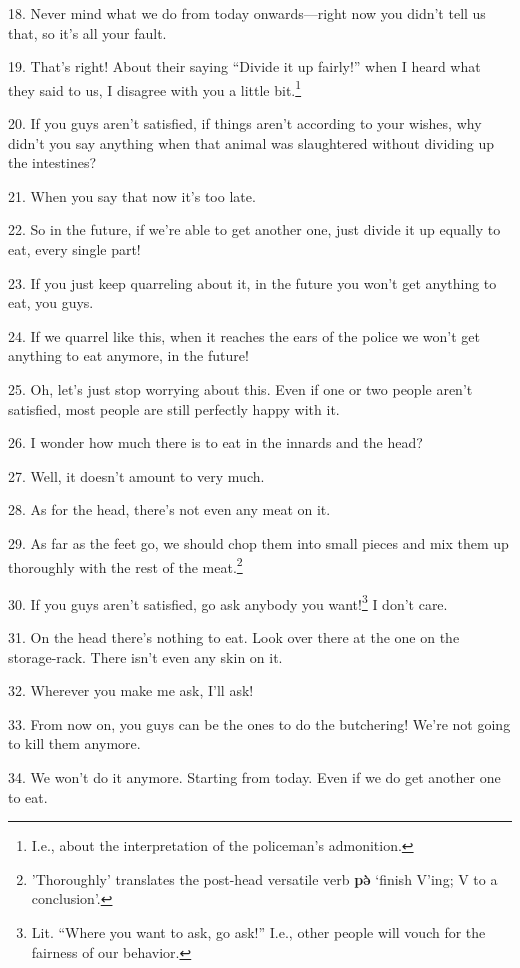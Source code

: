 18. Never mind what we do from today onwards---right now you didn't tell us that,
so it's all your fault.

19. That's right! About their saying ``Divide it up fairly!'' when I heard what
they said to us, I disagree with you a little bit.\footnote{I.e., about the interpretation of the policeman's admonition.}

20. If you guys aren't satisfied, if things aren't according to your wishes, why
didn't you say anything when that animal was slaughtered without dividing up the
intestines?

21. When you say that now it's too late.

22. So in the future, if we're able to get another one, just divide it up equally
to eat, every single part!

23. If you just keep quarreling about it, in the future you won't get anything
to eat, you guys.

24. If we quarrel like this, when it reaches the ears of the police we won't get
anything to eat anymore, in the future!

25. Oh, let's just stop worrying about this. Even if one or two people aren't satisfied,
most people are still perfectly happy with it.

26. I wonder how much there is to eat in the innards and the head?

27. Well, it doesn't amount to very much.

28. As for the head, there's not even any meat on it.

29. As far as the feet go, we should chop them into small pieces and mix them up
thoroughly with the rest of the meat.\footnote{'Thoroughly' translates the post-head versatile verb \textbf{pə̀} `finish V'ing; V to a conclusion'.}

30. If you guys aren't satisfied, go ask anybody you want!\footnote{Lit. ``Where you want to ask, go ask!'' I.e., other people will vouch for the fairness of our behavior.} I don't care.

31. On the head there's nothing to eat. Look over there at the one on the storage-rack.
There isn't even any skin on it.

32. Wherever you make me ask, I'll ask!

33. From now on, you guys can be the ones to do the butchering! We're not going
to kill them anymore.

34. We won't do it anymore. Starting from today. Even if we do get another one
to eat.

